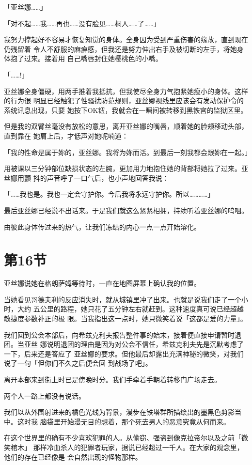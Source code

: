 \documentclass[11pt]{book}
\begin{document}
「亚丝娜……」

「对不起……我……再也……没有脸见……桐人……了……」

我努力撑起好不容易才恢复知觉的身体。全身因为受到严重伤害的缘故，直到现在仍残留着
令人不舒服的麻痹感，但我还是努力伸出右手及被切断的左手，将她身体抱了过来。接着用
自己嘴唇封住她樱桃色的小嘴。

「……!」

亚丝娜全身僵硬，用两手推着我抵抗，但我使尽全身力气抱紧她瘦小的身体。这样的行为很
明显已经触犯了性骚扰防范规则，亚丝娜视线里应该会有发动保护令的系统讯息出现，只要
她按下OK钮，我就会在一瞬间被转移到黑铁宫的监狱区里。

但是我的双臂丝毫没有放松的意思，离开亚丝娜的嘴唇，顺着她的脸颊移动头部，直到靠在
她肩上后，才低声对她呢喃道：

「我的性命是属于妳的，亚丝娜。我将为妳而活。到最后一刻我都会跟妳在一起。」

用被课以三分钟部位缺损状态的左腕，更加用力地抱住她的背部将她拉了过来。亚丝娜用颤
抖的声音呼了一口气后，也小声地回答我说：

「……我也是。我也一定会守护你。今后我将永远守护你。所以…………」

最后亚丝娜已经说不出话来。于是我们就这么紧紧相拥，持续听着亚丝娜的呜咽。

由彼此身体传过来的热气，让我们冻结的内心一点一点开始溶化。
\section{第16节}
\label{sec:org29b1ec9}
亚丝娜说她在格朗萨姆等待时，一直在地图屏幕上确认我的位置。

当她看见哥德夫利的反应消失时，就从城镇里冲了出来。也就是说我们走了一个小时，大约
五公里的路程，她只花了五分钟左右就赶到。这种速度真可说已经超越敏捷度参数补正的极
限。当我指出这一点时，她只微笑着说「这都是爱的力量」。

我们回到公会本部后，向希兹克利夫报告整件事的始末，接着便直接申请暂时退团。当亚丝
娜说明退团的理由是因为对公会不信任，希兹克利夫先是沉默考虑了一下，后来还是答应了
亚丝娜的要求。但他最后却露出充满神秘的微笑，对我们说了一句「但你们不久之后便会回
到战场了吧」。

离开本部来到街上时已是傍晚时分。我们手牵着手朝着转移门广场走去。

两个人一路上都没有说话。

我们以从外围射进来的橘色光线为背景，漫步在铁塔群所描绘出的墨黑色剪影当中。这时我
脑袋里开始漫无目的想着，那个死去男人的恶意究竟从何而来。

在这个世界里的确有不少喜欢犯罪的人。从偷窃、强盗到像克拉帝尔以及之前「微笑棺木」
那样冷血杀人的犯罪者玩家，据说已经超过一千人。在大家的观念里，他们的存在已经像是
会自然出现的怪物那样。
\end{document}
